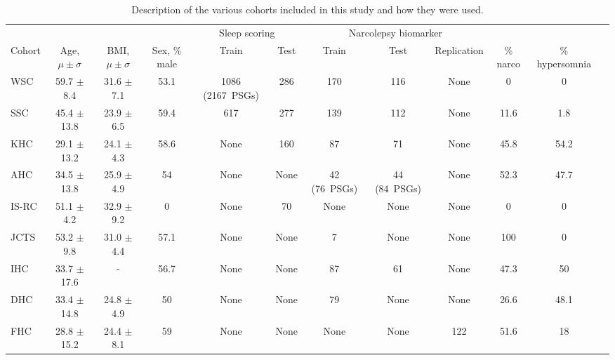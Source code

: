 \begin{landscape}
\begin{table}
\begin{threeparttable}  
\centering
\small
\caption[STAGES cohorts]{Description of the various cohorts included in this study and how they were used.}
\label{tab:paperiii-table01}
\begin{tabular}{@{}lccccccccccc@{}}
    \toprule
    & & & & \multicolumn{2}{c}{Sleep scoring} & \multicolumn{3}{c}{Narcolepsy biomarker} & & & \\ \cline{5-6} \cline{7-9}
    Cohort         & Age, $ \mu \pm \sigma $        & BMI, $ \mu \pm \sigma $        & Sex, \% male       & Train      & Test      & Train  & Test              & Replication            & \% narco & \% hypersomnia \\ \midrule
    WSC            & 59.7 $ \pm $ 8.4  & 31.6 $ \pm $ 7.1  & 53.1      & 1086 (2167~PSGs) & 286  & 170                  & 116          & None        & 0        & 0 \\
    SSC            & 45.4 $ \pm $ 13.8 & 23.9 $ \pm $ 6.5  & 59.4      & 617                & 277  & 139                  & 112          & None        & 11.6     & 1.8 \\
    KHC            & 29.1 $ \pm $ 13.2 & 24.1 $ \pm $ 4.3  & 58.6      & None               & 160  & 87                   & 71           & None        & 45.8     & 54.2 \\
    AHC            & 34.5 $ \pm $ 13.8 & 25.9 $ \pm $ 4.9  & 54        & None               & None & 42 (76~PSGs)         & 44 (84~PSGs) & None        & 52.3     & 47.7 \\
    IS-RC          & 51.1 $ \pm $ 4.2  & 32.9 $ \pm $ 9.2  & 0         & None               & 70   & None                 & None         & None        & 0        & 0 \\
    JCTS           & 53.2 $ \pm $ 9.8  & 31.0 $ \pm $ 4.4  & 57.1      & None               & None & 7                    & None         & None        & 100      & 0 \\
    IHC            & 33.7 $ \pm $ 17.6 & -           & 56.7      & None               & None & 87                   & 61           & None        & 47.3     & 50 \\
    DHC            & 33.4 $ \pm $ 14.8 & 24.8 $ \pm $ 4.9  & 50        & None               & None & 79                   & None         & None        & 26.6     & 48.1 \\
    FHC            & 28.8 $ \pm $ 15.2 & 24.4 $ \pm $ 8.1  & 59        & None               & None & None                 & None         & 122         & 51.6     & 18 \\

\end{tabular}
\end{threeparttable}
\end{table}
\end{landscape}
